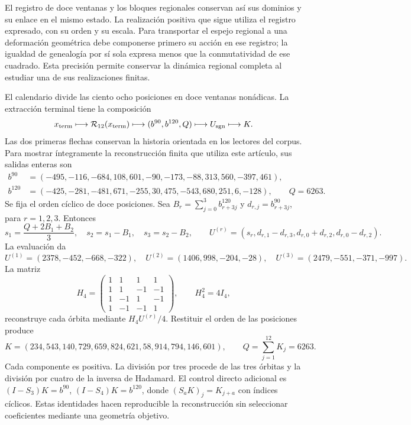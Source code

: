 \documentclass[a4paper,10pt]{article}
\theoremstyle{definition}\newtheorem{definition}[theorem]{Definición}
\theoremstyle{remark}\newtheorem{remark}[theorem]{Observación}
\numberwithin{equation}{section}
\begin{document}
El registro de doce ventanas y los bloques regionales conservan así
sus dominios y su enlace en el mismo estado. La realización positiva
que sigue utiliza el registro expresado, con su orden y su escala.
Para transportar el espejo regional a una deformación geométrica debe
componerse primero su acción en ese registro; la igualdad de genealogía
por sí sola expresa menos que la conmutatividad de ese cuadrado. Esta
precisión permite conservar la dinámica regional completa al estudiar
una de sus realizaciones finitas.

El calendario divide las ciento ocho posiciones en doce ventanas nonádicas.
La extracción terminal tiene la composición
\[
 x_{\rm term}\longmapsto\mathcal R_{12}(x_{\rm term})
 \longmapsto(b^{90},b^{120},Q)\longmapsto U_{\rm sgn}\longmapsto K.
\]
Las dos primeras flechas conservan la historia orientada en los lectores
del corpus. Para mostrar íntegramente la reconstrucción finita que utiliza
este artículo, sus salidas enteras son
\begin{align*}
 b^{90}&=(-495,-116,-684,108,601,-90,-173,-88,313,560,-397,461),\\
 b^{120}&=(-425,-281,-481,671,-255,30,475,-543,680,251,6,-128),
 \qquad Q=6263.
\end{align*}
Se fija el orden cíclico de doce posiciones. Sea
\(B_r=\sum_{j=0}^3 b^{120}_{r+3j}\) y
\(d_{r,j}=b^{90}_{r+3j}\), para \(r=1,2,3\). Entonces
\[
 s_1=\frac{Q+2B_1+B_2}{3},\quad s_2=s_1-B_1,\quad s_3=s_2-B_2,
 \qquad
 U^{(r)}=(s_r,d_{r,1}-d_{r,3},d_{r,0}+d_{r,2},d_{r,0}-d_{r,2}).
\]
La evaluación da
\[
 U^{(1)}=(2378,-452,-668,-322),\quad
 U^{(2)}=(1406,998,-204,-28),\quad
 U^{(3)}=(2479,-551,-371,-997).
\]
La matriz
\[
 H_4=\begin{pmatrix}1&1&1&1\\1&1&-1&-1\\1&-1&1&-1\\1&-1&-1&1\end{pmatrix},
 \qquad H_4^2=4I_4,
\]
reconstruye cada órbita mediante \(H_4U^{(r)}/4\). Restituir el orden
de las posiciones produce
\begin{equation}
 K=(234,543,140,729,659,824,621,58,914,794,146,601),
 \qquad Q=\sum_{j=1}^{12}K_j=6263.
 \label{eq:K-main}
\end{equation}
Cada componente es positiva. La división por tres procede de las tres
órbitas y la división por cuatro de la inversa de Hadamard. El control
directo adicional es \((I-S_3)K=b^{90}\),
\((I-S_4)K=b^{120}\), donde \((S_aK)_j=K_{j+a}\) con índices cíclicos.
Estas identidades hacen reproducible la reconstrucción sin seleccionar
coeficientes mediante una geometría objetivo.
\end{document}
